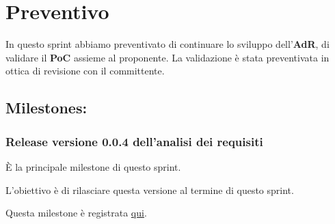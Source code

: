 \section{Preventivo}

In questo sprint abbiamo preventivato di continuare lo sviluppo dell'\textbf{AdR}, di validare il \textbf{PoC} assieme al proponente. La validazione è stata preventivata in ottica di revisione con il committente.

\subsection{Milestones:}  
\subsubsection{Release versione 0.0.4 dell'analisi dei requisiti}

È la principale milestone di questo sprint.

L'obiettivo è di rilasciare questa versione al termine di questo sprint.

Questa milestone è registrata \href{https://github.com/SWEasabi/analisi-dei-requisiti/milestone/4}{qui}.
